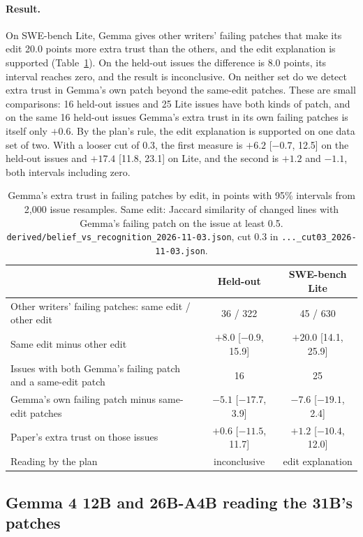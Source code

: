 \documentclass[10pt,letterpaper]{article}
\begin{document}
\paragraph{Result.} On SWE-bench Lite, Gemma gives other writers' failing patches that make its edit 20.0 points more
extra trust than the others, and the edit explanation is supported (Table~\ref{tab:edit}). On the held-out issues the
difference is 8.0 points, its interval reaches zero, and the result is inconclusive. On neither set do we detect extra
trust in Gemma's own patch beyond the same-edit patches. These are small comparisons: 16 held-out issues and 25 Lite
issues have both kinds of patch, and on the same 16 held-out issues Gemma's extra trust in its own failing patches is
itself only $+0.6$. By the plan's rule, the edit explanation is supported on one data set of two. With a looser cut of
0.3, the first measure is $+6.2$ [$-0.7$, 12.5] on the held-out issues and $+17.4$ [11.8, 23.1] on Lite, and the
second is $+1.2$ and $-1.1$, both intervals including zero.

\begin{table}[H]
\centering
\small
\caption{Gemma's extra trust in failing patches by edit, in points with 95\% intervals from 2,000 issue resamples.
Same edit: Jaccard similarity of changed lines with Gemma's failing patch on the issue at least 0.5.
\texttt{derived/belief\_vs\_recognition\_2026-11-03.json}, cut 0.3 in \texttt{...\_cut03\_2026-11-03.json}.}
\label{tab:edit}
\begin{tabular}{@{}lcc@{}}
\toprule
 & Held-out & SWE-bench Lite \\
\midrule
Other writers' failing patches: same edit / other edit & 36 / 322 & 45 / 630 \\
Same edit minus other edit & $+8.0$ [$-0.9$, 15.9] & $+20.0$ [14.1, 25.9] \\
Issues with both Gemma's failing patch and a same-edit patch & 16 & 25 \\
Gemma's own failing patch minus same-edit patches & $-5.1$ [$-17.7$, 3.9] & $-7.6$ [$-19.1$, 2.4] \\
Paper's extra trust on those issues & $+0.6$ [$-11.5$, 11.7] & $+1.2$ [$-10.4$, 12.0] \\
Reading by the plan & inconclusive & edit explanation \\
\bottomrule
\end{tabular}
\end{table}

\subsection*{Gemma 4 12B and 26B-A4B reading the 31B's patches}
\end{document}
